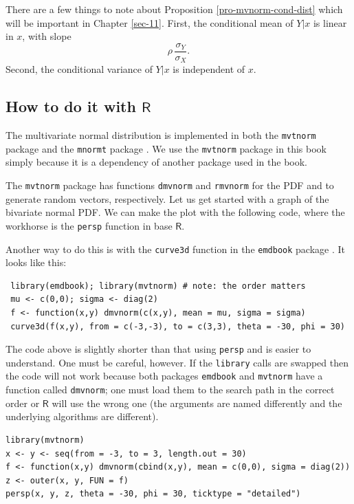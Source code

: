 \documentclass[captions=tableheading]{scrbook}
\begin{document}
There are a few things to note about Proposition \ref{pro-mvnorm-cond-dist} which will be important in Chapter \ref{sec-11}. First, the conditional mean of \(Y|x\) is linear in \(x\), with slope
\begin{equation}
\rho\,\frac{\sigma_{Y}}{\sigma_{X}}.\label{eq-population-slope-slr}
\end{equation}
Second, the conditional variance of \(Y|x\) is independent of \(x\). 
\subsection{How to do it with \(\mathsf{R}\)}
\label{sec-7-6-1}


The multivariate normal distribution is implemented in both the \texttt{mvtnorm} package \cite{Genzmvtnorm} and the \texttt{mnormt} package \cite{mnormt}. We use the \texttt{mvtnorm} package in this book simply because it is a dependency of another package used in the book. 

The \texttt{mvtnorm} package has functions \texttt{dmvnorm} and \texttt{rmvnorm} for the PDF and to generate random vectors, respectively. Let us get started with a graph of the bivariate normal PDF. We can make the plot with the following code, where the workhorse is the \texttt{persp} function in base \(\mathsf{R}\).

Another way to do this is with the \texttt{curve3d} function in the \texttt{emdbook} package \cite{emdbook}. It looks like this:
\begin{verbatim}
 library(emdbook); library(mvtnorm) # note: the order matters
 mu <- c(0,0); sigma <- diag(2)
 f <- function(x,y) dmvnorm(c(x,y), mean = mu, sigma = sigma)
 curve3d(f(x,y), from = c(-3,-3), to = c(3,3), theta = -30, phi = 30)
\end{verbatim}
The code above is slightly shorter than that using \texttt{persp} and is easier to understand. One must be careful, however. If the \texttt{library} calls are swapped then the code will not work because both packages \texttt{emdbook} and \texttt{mvtnorm} have a function called \texttt{dmvnorm}; one must load them to the search path in the correct order or \(\mathsf{R}\) will use the wrong one (the arguments are named differently and the underlying algorithms are different).


\begin{verbatim}
library(mvtnorm)
x <- y <- seq(from = -3, to = 3, length.out = 30)
f <- function(x,y) dmvnorm(cbind(x,y), mean = c(0,0), sigma = diag(2))
z <- outer(x, y, FUN = f)
persp(x, y, z, theta = -30, phi = 30, ticktype = "detailed")
\end{verbatim}
\end{document}

